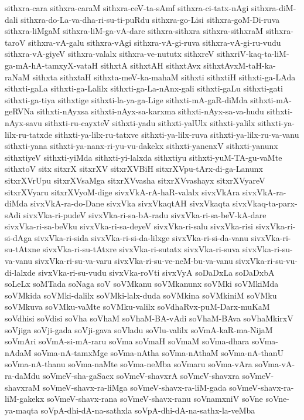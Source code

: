 {sithxra-cara
sithxra-caraM
sithxra-ceV-ta-sAmf
sithxra-ci-tatx-nAgi
sithxra-diM-dali
sithxra-do-La-va-dha-ri-su-ti-puRdu
sithxra-go-Lisi
sithxra-goM-Di-ruva
sithxra-liMgaM
sithxra-liM-ga-vA-dare
sithxra-sithxra
sithxra-sithxraM
sithxra-taroV
sithxra-vA-galu
sithxra-vAgi
sithxra-vA-gi-ruva
sithxra-vA-gi-ru-vudu
sithxra-vA-giyeV
sithxra-valalx
sithxra-ve-nututx
sithxreV
sithxriV-kaq-ta-liM-ga-mA-hA-tamxyX-vataH
sithxtA
sithxtAH
sithxtAvx
sithxtAvxM-taH-ka-raNaM
sithxta
sithxtaH
sithxta-meV-ka-mahaM
sithxti
sithxtiH
sithxti-ga-LAda
sithxti-gaLa
sithxti-ga-Lalilx
sithxti-ga-La-nAnx-gali
sithxti-gaLu
sithxti-gati
sithxti-ga-tiya
sithxtige
sithxti-la-ya-ga-Lige
sithxti-mA-gaR-diMda
sithxti-mA-geRVNa
sithxti-nAyxsa
sithxti-nAyx-sa-karxma
sithxti-nAyx-sa-va-hudu
sithxti-nAyx-savu
sithxti-ru-cayxteV
sithxti-yadu
sithxti-yalUlx
sithxti-yalilx
sithxti-ya-lilx-ru-tatxde
sithxti-ya-lilx-ru-tatxve
sithxti-ya-lilx-ruva
sithxti-ya-lilx-ru-va-vanu
sithxti-yana
sithxti-ya-nanx-ri-yu-vu-dakekx
sithxti-yanenxV
sithxti-yanunx
sithxtiyeV
sithxti-yiMda
sithxti-yi-lalxda
sithxtiyu
sithxti-yuM-TA-gu-vaMte
sithxtoV
sitx
sitxrX
sitxrXV
sitxrXVBiH
sitxrXVpu-tArx-di-ga-Lanunx
sitxrXVrUpu
sitxrXVsaMga
sitxrXVvasha
sitxrXVvashayx
sitxrXVyareV
sitxrXVyaru
sitxrXVyoM-dige
sivxVkA-rA-haR-valalx
sivxVkAra
sivxVkA-ra-diMda
sivxVkA-ra-do-Dane
sivxVka
sivxVkaqtAH
sivxVkaqta
sivxVkaq-ta-parx-sAdi
sivxVka-ri-pudeV
sivxVka-ri-sa-bA-radu
sivxVka-ri-sa-beV-kA-dare
sivxVka-ri-sa-beVku
sivxVka-ri-sa-deyeV
sivxVka-ri-salu
sivxVka-risi
sivxVka-ri-si-dAga
sivxVka-ri-sida
sivxVka-ri-si-da-lilxge
sivxVka-ri-si-da-vanu
sivxVka-ri-su-tAtxne
sivxVka-ri-su-tAtxre
sivxVka-ri-sutatx
sivxVka-ri-suva
sivxVka-ri-su-va-vanu
sivxVka-ri-su-va-varu
sivxVka-ri-su-ve-neM-bu-va-vanu
sivxVka-ri-su-vu-di-lalxde
sivxVka-ri-su-vudu
sivxVka-roVti
sivxVyA
soDaDxLa
soDaDxbA
soLeLx
soMTada
soNaga
soV
soVMkanu
soVMkanunx
soVMki
soVMkiMda
soVMkida
soVMki-dalilx
soVMki-lalx-duda
soVMkina
soVMkiniM
soVMku
soVMkuva
soVMku-vaMte
soVMku-valilx
soVdhaRvx-puM-Darx-muKaM
soVdhisi
soVdisi
soVha
soVhaM
soVhaM-BA-vAdi
soVhaM-BAva
soVhaMkirxV
soVjiga
soVji-gada
soVji-gava
soVladu
soVlu-valilx
soVmA-kaR-ma-NijaM
soVmAri
soVmA-si-mA-raru
soVma
soVmaH
soVmaM
soVma-dhara
soVma-nAdaM
soVma-nA-tamxMge
soVma-nAtha
soVma-nAthaM
soVma-nA-thanU
soVma-nA-thanu
soVma-naMte
soVma-neMba
soVmaru
soVma-vAra
soVma-vA-ra-daMdu
soVmeV-sha-gaSacx
soVmeV-shavxrA
soVmeV-shavxra
soVmeV-shavxraM
soVmeV-shavx-ra-liMga
soVmeV-shavx-ra-liM-gada
soVmeV-shavx-ra-liM-gakekx
soVmeV-shavx-rana
soVmeV-shavx-ranu
soVnamxniV
soVne
soVne-ya-maqta
soVpA-dhi-dA-na-sathxla
soVpA-dhi-dA-na-sathx-la-veMba
}
